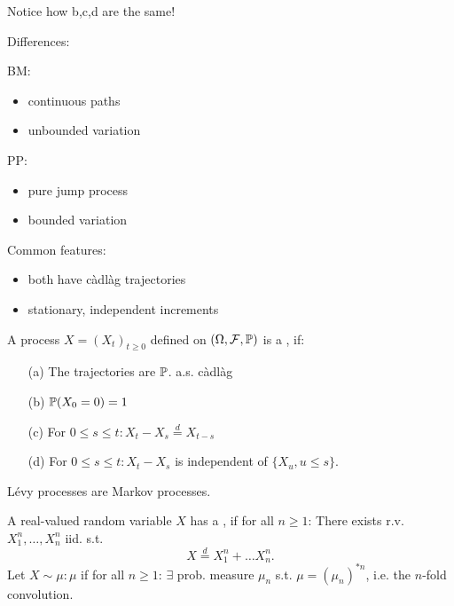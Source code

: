 Notice how b,c,d are the same!

Differences:

BM: 
\begin{itemize}
    \item continuous paths 
    \item unbounded variation
\end{itemize}

PP: 
\begin{itemize}
    \item pure jump process
    \item bounded variation
\end{itemize}

Common features: 

\begin{itemize}
    \item both have càdlàg trajectories
    \item stationary, independent increments
\end{itemize}

\begin{definition}\label{def:4.1}
    A process $X=(X_t)_{t\geq 0}$ defined on $(\Omega,\mathcal{F},\mathbb{P})$ is a , if:
    \begin{enumerate}
        \item[(a)] The trajectories are $\mathbb{P}$. a.s. càdlàg 
        \item[(b)] $\mathbb{P}(X_0=0)=1$
        \item[(c)] For $0\leq s\leq t: X_t-X_s\stackrel{d}{=}X_{t-s}$
        \item[(d)] For $0\leq s\leq t: X_t-X_s$ is independent of $\{X_u,u\leq s\}$.    
    \end{enumerate}
\end{definition}

\begin{remark}
    Lévy processes are Markov processes.
\end{remark}

\begin{definition}\label{def:4.2}
    A real-valued random variable $X$ has a , if 
    for all $n\geq 1$: There exists r.v. $X_1^n,\dots,X_n^n$ iid. s.t. \[X\stackrel{d}{=}X_1^n+\dots X_n^n.\] 
    Let $X\sim \mu: \mu$  if for all $n\geq 1$:
    $\exists$ prob. measure $\mu_n$ s.t. $\mu=(\mu_n)^{*n}$, i.e. the $n$-fold convolution. 
\end{definition}

